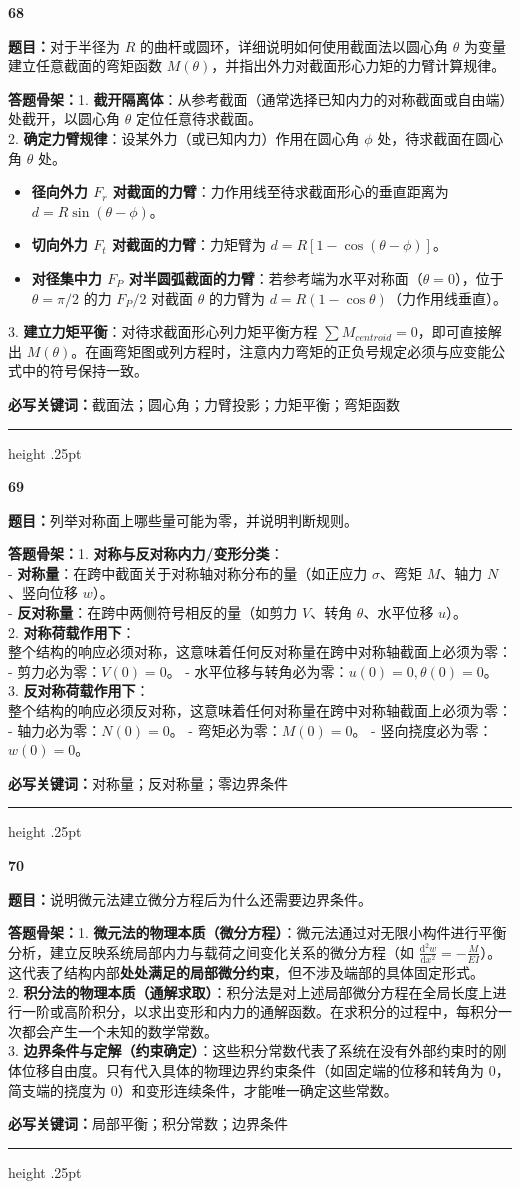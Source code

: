 \documentclass[a4paper,10pt]{article}
\newcommand{\qitem}[5]{%
\Needspace{6\baselineskip}
\vspace{3pt}
{\Large\bfseries\color{deep} #1}\quad{\bfseries\color{orangea}#2}\par
\textbf{题目：}#3\par
\textbf{答题骨架：}#4\par
\textbf{必写关键词：}{\color{bluea}#5}\par
\vspace{2pt}\hrule height .25pt
}
\begin{document}
\qitem{68}{圆环弯矩函数}
{对于半径为 \(R\) 的曲杆或圆环，详细说明如何使用截面法以圆心角 \(\theta\) 为变量建立任意截面的弯矩函数 \(M(\theta)\)，并指出外力对截面形心力矩的力臂计算规律。}
{1. \textbf{截开隔离体}：从参考截面（通常选择已知内力的对称截面或自由端）处截开，以圆心角 \(\theta\) 定位任意待求截面。\\
2. \textbf{确定力臂规律}：设某外力（或已知内力）作用在圆心角 \(\phi\) 处，待求截面在圆心角 \(\theta\) 处。
   \begin{itemize}
     \item \textbf{径向外力 \(F_r\) 对截面的力臂}：力作用线至待求截面形心的垂直距离为 \(d = R \sin(\theta - \phi)\)。
     \item \textbf{切向外力 \(F_t\) 对截面的力臂}：力矩臂为 \(d = R [1 - \cos(\theta - \phi)]\)。
     \item \textbf{对径集中力 \(F_P\) 对半圆弧截面的力臂}：若参考端为水平对称面（\(\theta=0\)），位于 \(\theta=\pi/2\) 的力 \(F_P/2\) 对截面 \(\theta\) 的力臂为 \(d = R(1 - \cos\theta)\)（力作用线垂直）。
   \end{itemize}
3. \textbf{建立力矩平衡}：对待求截面形心列力矩平衡方程 \(\sum M_{centroid} = 0\)，即可直接解出 \(M(\theta)\)。在画弯矩图或列方程时，注意内力弯矩的正负号规定必须与应变能公式中的符号保持一致。}
{截面法；圆心角；力臂投影；力矩平衡；弯矩函数}

\qitem{69}{对称性判断零量}
{列举对称面上哪些量可能为零，并说明判断规则。}
{1. \textbf{对称与反对称内力/变形分类}：\\
   - \textbf{对称量}：在跨中截面关于对称轴对称分布的量（如正应力 \(\sigma\)、弯矩 \(M\)、轴力 \(N\)、竖向位移 \(w\)）。\\
   - \textbf{反对称量}：在跨中两侧符号相反的量（如剪力 \(V\)、转角 \(\theta\)、水平位移 \(u\)）。\\
2. \textbf{对称荷载作用下}：\\
   整个结构的响应必须对称，这意味着任何反对称量在跨中对称轴截面上必须为零：
   - 剪力必为零：\(V(0) = 0\)。
   - 水平位移与转角必为零：\(u(0) = 0, \theta(0) = 0\)。\\
3. \textbf{反对称荷载作用下}：\\
   整个结构的响应必须反对称，这意味着任何对称量在跨中对称轴截面上必须为零：
   - 轴力必为零：\(N(0) = 0\)。
   - 弯矩必为零：\(M(0) = 0\)。
   - 竖向挠度必为零：\(w(0) = 0\)。}
{对称量；反对称量；零边界条件}

\qitem{70}{微元法与积分法关系}
{说明微元法建立微分方程后为什么还需要边界条件。}
{1. \textbf{微元法的物理本质（微分方程）}：微元法通过对无限小构件进行平衡分析，建立反映系统局部内力与载荷之间变化关系的微分方程（如 \(\frac{\mathrm{d}^2w}{\mathrm{d}x^2} = -\frac{M}{EI}\)）。这代表了结构内部\textbf{处处满足的局部微分约束}，但不涉及端部的具体固定形式。\\
2. \textbf{积分法的物理本质（通解求取）}：积分法是对上述局部微分方程在全局长度上进行一阶或高阶积分，以求出变形和内力的通解函数。在求积分的过程中，每积分一次都会产生一个未知的数学常数。\\
3. \textbf{边界条件与定解（约束确定）}：这些积分常数代表了系统在没有外部约束时的刚体位移自由度。只有代入具体的物理边界约束条件（如固定端的位移和转角为 0，简支端的挠度为 0）和变形连续条件，才能唯一确定这些常数。}
{局部平衡；积分常数；边界条件}
\end{document}

